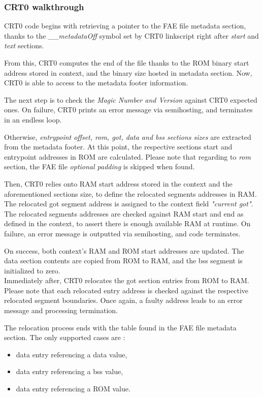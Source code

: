 \documentclass[10pt,a4paper,titlepage]{refart}
\begin{document}
\subsubsection{CRT0 walkthrough}
CRT0 code begins with retrieving a pointer to the FAE file metadata section, thanks to the \textit{\_\_metadataOff} symbol set by CRT0 linkscript right after \textit{start} and \textit{text} sections.

From this, CRT0 computes the end of the file thanks to the ROM binary start address stored in context, and the binary size hosted in metadata section.
Now, CRT0 is able to access to the metadata footer information.

The next step is to check the \textit{Magic Number and Version} against CRT0 expected ones.
On failure, CRT0 prints an error message via semihosting, and terminates in an endless loop.

Otherwise, \textit{entrypoint offset, rom, got, data and bss sections sizes} are extracted from the metadata footer.
At this point, the respective sections start and entrypoint addresses in ROM are calculated.
Please note that regarding to \textit{rom} section, the FAE file \textit{optional padding} is skipped when found.

Then, CRT0 relies onto RAM start address stored in the context and the aforementioned sections size, to define the relocated segments addresses in RAM.
The relocated got segment address is assigned to the context field \textit{"current got"}.\\
The relocated segments addresses are checked against RAM start and end as defined in the context, to assert there is enough available RAM at runtime.
On failure, an error message is outputted via semihosting, and code terminates.

On success, both context's RAM and ROM start addresses are updated.
The data section contents are copied from ROM to RAM, and the bss segment is initialized to zero.\\
Immediately after, CRT0 relocates the got section entries from ROM to RAM.
Please note that each relocated entry address is checked against the respective relocated segment boundaries.
Once again, a faulty address leads to an error message and processing termination.

The relocation process ends with the table found in the FAE file metadata section.
The only supported cases are :
\begin{itemize}
    \item data entry referencing a data value,
    \item data entry referencing a bss value,
    \item data entry referencing a ROM value.
\end{itemize}
\end{document}
